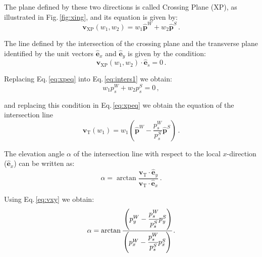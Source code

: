 The plane defined by these two directions is called Crossing Plane (XP), as illustrated in Fig.\,\ref{fig:xing}, and its equation is given by:
\begin{equation}
    \textbf{v}_\text{XP}(w_1, w_2) = w_1 \hat{\textbf{p}}^W +
    w_2 \hat{\textbf{p}}^S \, .
\label{eq:xpeq}
\end{equation}

The line defined by the intersection of the crossing plane and the transverse plane identified by the unit vectors $\hat{\textbf{e}}_x$  and $\hat{\textbf{e}}_y$ is given by the condition:
\begin{equation}
\textbf{v}_\text{XP}(w_1, w_2) \cdot \hat{\textbf{e}}_s=0 \, .
\label{eq:inters1}
\end{equation}

Replacing Eq.\,\eqref{eq:xpeq} into Eq.\,\eqref{eq:inters1} we obtain:
\begin{equation}
 w_1 p^W_s + w_2 p^S_s = 0 \, ,
\end{equation}

and replacing this condition in Eq.\,\eqref{eq:xpeq} we obtain the equation of the intersection line
\begin{equation}
    \textbf{v}_\text{T}(w_1) = w_1 \left(\hat{\textbf{p}}^W -
    \frac{p^W_{s}}{p^S_{s}} \hat{\textbf{p}}^S\right)
    \, .
\label{eq:vxy}
\end{equation}



The elevation angle $\alpha$ of the intersection line with respect to the local $x$-direction ($\hat{\textbf{e}}_x$) can be written as:
\begin{equation}
    \alpha=\arctan \frac
    {\textbf{v}_\text{T}\cdot\hat{\textbf{e}}_y}
    {\textbf{v}_\text{T}\cdot\hat{\textbf{e}}_x}
    \, .
\end{equation}

Using Eq.\,\eqref{eq:vxy} we obtain:
\begin{equation}
    \alpha=\arctan \cfrac
    {\left(p_y^W -
    \cfrac{p^W_{s}}{p^S_{s}} p_y^S\right)}
    {\left(p_x^W -
    \cfrac{p^W_{s}}{p^S_{s}} p_x^S\right)}
    \,. 
\end{equation}

